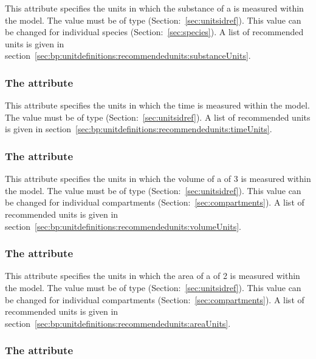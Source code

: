 This attribute specifies the units in which the substance of a
\Species is measured within the model. The value must be of type
 (Section:~\vref{sec:unitsidref}). This value
can be changed for individual species
(Section:~\vref{sec:species}). A list of recommended units is
given in section~\vref{sec:bp:unitdefinitions:recommendedunits:substanceUnits}. 

\subsubsection{The  attribute}
\label{sec:model-timeUnits}

This attribute specifies the units in which the time is measured
within the model. The value must be of type 
(Section:~\vref{sec:unitsidref}). A list of recommended units is given in
section~\vref{sec:bp:unitdefinitions:recommendedunits:timeUnits}. 

\subsubsection{The  attribute}
\label{sec:model-volumeUnits}

This attribute specifies the units in which the volume of a
\Compartment of  3 is measured within the model. The
value must be of type 
(Section:~\vref{sec:unitsidref}). This value can be changed for
individual compartments (Section:~\vref{sec:compartments}). A
list of recommended units is given in
section~\vref{sec:bp:unitdefinitions:recommendedunits:volumeUnits}.  

\subsubsection{The  attribute}
\label{sec:model-areaUnits}

This attribute specifies the units in which the area of a
\Compartment of  2 is measured within the model. The
value must be of type 
(Section:~\vref{sec:unitsidref}). This value can be changed for
individual compartments (Section:~\vref{sec:compartments}). A
list of recommended units is given in
section~\vref{sec:bp:unitdefinitions:recommendedunits:areaUnits}.  

\subsubsection{The  attribute}
\label{sec:model-lengthUnits}


